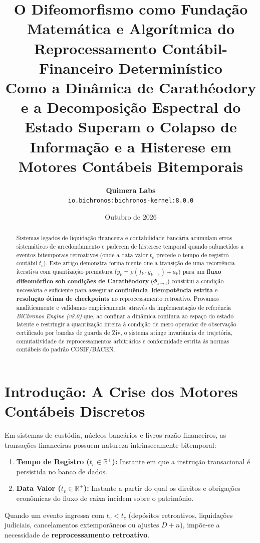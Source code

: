 \documentclass[11pt,a4paper]{article}
\title{\textbf{O Difeomorfismo como Fundação Matemática e Algorítmica do Reprocessamento Contábil-Financeiro Determinístico}\\
\large Como a Dinâmica de Carathéodory e a Decomposição Espectral do Estado Superam o Colapso de Informação e a Histerese em Motores Contábeis Bitemporais}
\author{\textbf{Quimera Labs} \\
\texttt{io.bichronos:bichronos-kernel:8.0.0}}
\date{Outubro de 2026}
\theoremstyle{definition}
\theoremstyle{remark}
\begin{document}
\maketitle

\begin{abstract}
Sistemas legados de liquidação financeira e contabilidade bancária acumulam erros sistemáticos de arredondamento e padecem de histerese temporal quando submetidos a eventos bitemporais retroativos (onde a data valor $t_v$ precede o tempo de registro contábil $t_c$). Este artigo demonstra formalmente que a transição de uma recorrência iterativa com quantização prematura ($y_k = \rho(f_k \cdot y_{k-1}) + a_k$) para um \textbf{fluxo difeomórfico sob condições de Carathéodory} ($\Phi_{s \to t}$) constitui a condição necessária e suficiente para assegurar \textbf{confluência}, \textbf{idempotência estrita} e \textbf{resolução ótima de checkpoints} no reprocessamento retroativo. Provamos analiticamente e validamos empiricamente através da implementação de referência \emph{BiChronos Engine (v8.0)} que, ao confinar a dinâmica contínua ao espaço do estado latente e restringir a quantização inteira à condição de mero operador de observação certificado por bandas de guarda de Ziv, o sistema atinge invariância de trajetória, comutatividade de reprocessamentos arbitrários e conformidade estrita às normas contábeis do padrão COSIF/BACEN.
\end{abstract}

\section{Introdução: A Crise dos Motores Contábeis Discretos}

Em sistemas de custódia, núcleos bancários e livros-razão financeiros, as transações financeiras possuem natureza intrinsecamente bitemporal:
\begin{enumerate}
    \item \textbf{Tempo de Registro ($t_c \in \mathbb{R}^+$):} Instante em que a instrução transacional é persistida no banco de dados.
    \item \textbf{Data Valor ($t_v \in \mathbb{R}^+$):} Instante a partir do qual os direitos e obrigações econômicas do fluxo de caixa incidem sobre o patrimônio.
\end{enumerate}

Quando um evento ingressa com $t_v < t_c$ (depósitos retroativos, liquidações judiciais, cancelamentos extemporâneos ou ajustes $D+n$), impõe-se a necessidade de \textbf{reprocessamento retroativo}.
\end{document}
